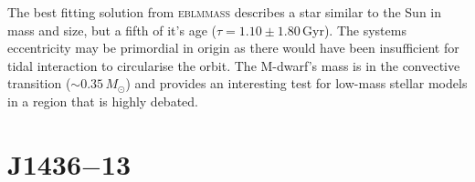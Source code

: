 The best fitting solution from \textsc{eblmmass} describes a star similar to the Sun in mass and size, but a fifth of it's age ($\tau = 1.10 \pm 1.80$\,Gyr). The systems eccentricity may be primordial in origin as there would have been insufficient for tidal interaction to circularise the orbit.  The M-dwarf's mass is in the convective transition ($\sim 0.35\,M_\odot$) and provides an interesting test for low-mass stellar models in a region that is highly debated. %









\section{J1436$-$13}

